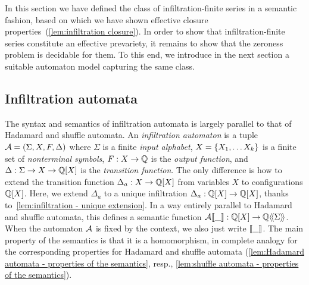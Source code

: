 In this section we have defined the class of infiltration-finite series in a semantic fashion,
based on which we have shown effective closure properties~(\cref{lem:infiltration closure}).
%
In order to show that infiltration-finite series constitute an effective prevariety,
it remains to show that the zeroness problem is decidable for them.
%
To this end, we introduce in the next section a suitable automaton model capturing the same class.

\subsection{Infiltration automata}
\label{sec:infiltration automata}

The syntax and semantics of infiltration automata is largely parallel to that of Hadamard and shuffle automata.
An \emph{infiltration automaton} is a tuple
$\AA = \tuple{\Sigma, X, F, \Delta}$
where $\Sigma$ is a finite \emph{input alphabet},
$X = \set{X_1,  \dots X_k}$ is a finite set of \emph{nonterminal symbols},
$F : X \to \Q$ is the \emph{output function},
and $\Delta : \Sigma \to X \to \poly \Q X$ is the \emph{transition function}.
%
The only difference is how to extend the transition function $\Delta_a : X \to \poly \Q X$
from variables $X$ to configurations $\poly \Q X$.
%
Here, we extend $\Delta_a$ to a unique infiltration $\Delta_a : \poly \Q X \to \poly \Q X$,
thanks to~\cref{lem:infiltration - unique extension}.
%
In a way entirely parallel to Hadamard and shuffle automata,
this defines a semantic function $\Asem \AA \_ : \poly \Q X \to \series \Q \Sigma$.
%
When the automaton $\AA$ is fixed by the context, we also just write $\sem \_$.
%
The main property of the semantics is that it is a homomorphism,
in complete analogy for the corresponding properties for Hadamard and shuffle automata
(\cref{lem:Hadamard automata - properties of the semantics},
resp., \cref{lem:shuffle automata - properties of the semantics}).
%
